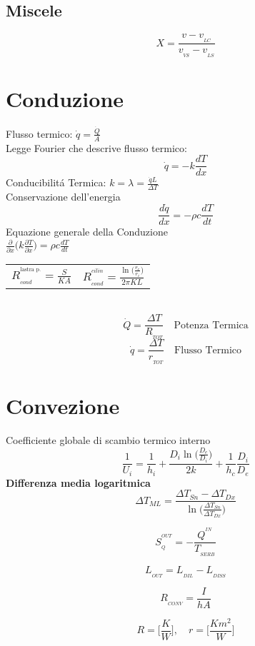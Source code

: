 \documentclass[portrait,a4paper]{article}
\begin{document}
\begin{multicols}{3}
\subsection*{Miscele}
\[ X =\frac{v - v_{_{LC}}}{v_{_{VS}} - v_{_{LS}}}\]


\section*{Conduzione}
Flusso termico: \(\dot{q} = \frac{\dot{Q}}{A} \) \\
Legge Fourier che descrive flusso termico:
\[
\dot{q} = -k\frac{dT}{dx}
\]
Conducibilitá Termica: \( k = \lambda = \frac{\dot{q}L}{\Delta T}\) \\
Conservazione dell'energia
\[
\frac{d\dot{q}}{dx}=-\rho c\frac{dT}{dt}
\]
Equazione generale della Conduzione \\
\(\frac{\partial}{\partial x}\bigg( k\frac{\partial T}{\partial x} \bigg) = \rho c \frac{dT}{dt}
\) \\
\begin{tabular}{c|c}
$ R_{_{cond}}^{^{\text{lastra p.}}} =\frac{S}{KA}$
& $ R_{_{cond}}^{^{cilin}} = \frac {\ln \Big ( \frac {r_{e}}{r_{i}} \Big )} {2 \pi KL} $
\end{tabular} \\

\[ \dot{Q} =\frac{\Delta T}{R_{_{TOT}}}  \quad \textrm{Potenza Termica} \]
\[ \dot{q} =\frac{\Delta T}{r_{_{TOT}}}  \quad \textrm{Flusso Termico} \]


\section*{Convezione}
Coefficiente globale di scambio termico interno
\[ \frac {1}{U_{i}} = \frac {1}{h_{i}} + \frac {D_{i} \ln \Big( \frac {D_{e}}{D_{i}} \Big) } {2k} + \frac {1}{h_{c}} \frac {D_{i}}{D_{e}}  \]
\textbf{Differenza media logaritmica}
\[ \Delta T_{ML} = \frac {\Delta T_{Sn}-\Delta T_{Dx}} { \ln \Big( \frac { \Delta T_{Sn}}{\Delta T_{Dx}} \Big) }   \]








\[ S_{_Q}^{^{OUT}}= - \frac{Q^{^{IN}}}{T_{_{SERB}}} \]

\[L_{_{OUT}}= L_{_{DIL}}- L_{_{DISS}} \]




\[ R_{_{CONV}} =\frac{I}{hA}\]
	
\[ R = \Big [\frac {K}{W}\Big ], \quad  r =\Big [\frac{Km^{2}}{W} \Big ]\]





\end{multicols}
\end{document}
